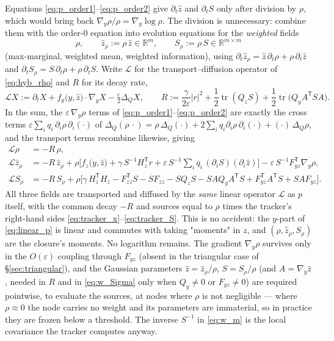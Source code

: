 \documentclass[11pt,a4paper]{article}
\newcommand{\R}{\mathbb{R}}
\newcommand{\tr}{\operatorname{tr}}
\newcommand{\T}{^{\mathsf T}}
\newcommand{\zh}{\hat{z}}
\newcommand{\zr}{\hat{z}_{\rho}}   %
\newcommand{\Sr}{S_{\rho}}          %
\newcommand{\eps}{\varepsilon}
\newcommand{\abs}[1]{\left\lvert #1 \right\rvert}
\newcommand{\gy}{\nabla_{\!y}}
\theoremstyle{plain}
\theoremstyle{definition}
\theoremstyle{remark}
\begin{document}
Equations \eqref{eq:p_order1}--\eqref{eq:p_order2} give $\partial_t\zh$ and $\partial_tS$ only after division by $\rho$, which would bring back $\gy\rho/\rho=\gy\log\rho$. The division is unnecessary: combine them with the order-0 equation into evolution equations for the \emph{weighted} fields
\[
  \rho, \qquad \zr := \rho\,\zh\in\R^m, \qquad \Sr := \rho\,S\in\R^{m\times m}
\]
(max-marginal, weighted mean, weighted information), using $\partial_t\zr = \zh\,\partial_t\rho + \rho\,\partial_t\zh$ and $\partial_t\Sr = S\,\partial_t\rho + \rho\,\partial_tS$. Write $\mathcal L$ for the transport--diffusion operator of \eqref{eq:hyb_rho} and $R$ for its decay rate,
\[
  \mathcal L X := \partial_t X + f_y\big(y,\zh\big)\cdot\gy X - \tfrac{\eps}{2}\Delta_Q X,
  \qquad
  R := \frac{\gamma}{2\eps}\abs{r}^2 + \frac12\tr(Q_zS) + \frac12\tr\big(Q_yA\T SA\big).
\]
In the sum, the $\eps\,\gy\rho$ terms of \eqref{eq:p_order1}--\eqref{eq:p_order2} are exactly the cross terms $\eps\sum_iq_i\,\partial_i\rho\,\partial_i(\cdot)$ of $\Delta_Q(\rho\,\cdot) = \rho\,\Delta_Q(\cdot) + 2\sum_iq_i\partial_i\rho\,\partial_i(\cdot) + (\cdot)\,\Delta_Q\rho$, and the transport terms recombine likewise, giving
\begin{align}
  \mathcal L\rho &= -R\,\rho, \label{eq:w_rho}\\
  \mathcal L\zr &= -R\,\zr + \rho\Big[ f_z\big(y,\zh\big) + \gamma\,S^{-1}H_z\T r + \eps\,S^{-1}\!\sum_{i} q_i\,(\partial_iS)(\partial_i\zh)\Big] - \eps\,S^{-1}F_{yz}\T\gy\rho, \label{eq:w_m}\\
  \mathcal L\Sr &= -R\,\Sr + \rho\Big[ \gamma\,H_z\T H_z - F_{zz}\T S - SF_{zz} - SQ_zS - SAQ_yA\T S + F_{yz}\T A\T S + SAF_{yz}\Big]. \label{eq:w_Sigma}
\end{align}
All three fields are transported and diffused by the \emph{same} linear operator $\mathcal L$ as $p$ itself, with the common decay $-R$ and sources equal to $\rho$ times the tracker's right-hand sides \eqref{eq:tracker_x}--\eqref{eq:tracker_S}. This is no accident: the $y$-part of \eqref{eq:linear_p} is linear and commutes with taking "moments" in $z$, and $(\rho,\zr,\Sr)$ are the closure's moments. No logarithm remains. The gradient $\gy\rho$ survives only in the $O(\eps)$ coupling through $F_{yz}$ (absent in the triangular case of \S\ref{sec:triangular}), and the Gaussian parameters $\zh = \zr/\rho$, $S=\Sr/\rho$ (and $A=\gy\zh$, needed in $R$ and in \eqref{eq:w_Sigma} only when $Q_y\ne0$ or $F_{yz}\ne0$) are required pointwise, to evaluate the sources, at nodes where $\rho$ is not negligible --- where $\rho\approx0$ the node carries no weight and its parameters are immaterial, so in practice they are frozen below a threshold. The inverse $S^{-1}$ in \eqref{eq:w_m} is the local covariance the tracker computes anyway.
\end{document}
